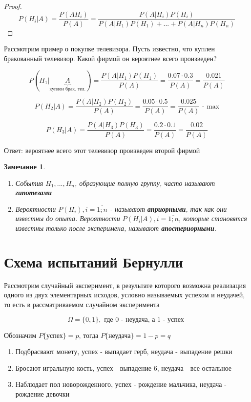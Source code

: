 \documentclass[a4paper, 14pt]{report}
\newtheorem{note}{Замечание}[chapter]
\begin{document}
\begin{proof}
    $$
    P(H_i|A) = \frac{P(A H_i)}{P(A)} = \frac{P(A|H_i) P(H_i)}{P(A|H_1) P(H_1) + ... + P(A|H_n) P(H_n) }
    $$
\end{proof}

Рассмотрим пример о покупке телевизора. Пусть известно, что куплен бракованный телевизор. Какой фирмой он вероятнее всего произведен?

$$
P(H_1| \underbrace{A}_\text{куплен брак. тел.}) = \frac{P(A|H_1)P(H_1)}{P(A)} = \frac{0.07 \cdot 0.3}{P(A)} = \frac{0.021}{P(A)}
$$

$$
P(H_2|A) = \frac{P(A|H_2)P(H_2)}{P(A)} = \frac{0.05 \cdot 0.5}{P(A)} = \frac{0.025}{P(A)} \text{ - max}
$$

$$
P(H_3|A) = \frac{P(A|H_3)P(H_3)}{P(A)} = \frac{0.2 \cdot 0.1}{P(A)} = \frac{0.02}{P(A)}
$$

Ответ: вероятнее всего этот телевизор произведен второй фирмой

\begin{note}
    \begin{enumerate}
        \item События $H_1,...,H_n$, образующие полную группу, часто называют \textbf{гипотезами}
        \item Вероятности $P(H_i), i = \overline{1;n}$ - называют \textbf{априорными}, так как они известны до опыта. Вероятности $P(H_i|A), i = \overline{1;n}$, которые становятся известны только после эксперимена, называют \textbf{апостериорными}.
    \end{enumerate}
\end{note}

\section{Схема испытаний Бернулли}

Рассмотрим случайный эксперимент, в результате которого возможна реализация одного из двух элементарных исходов, условно называемых успехом и неудачей, то есть в рассматриваемом случайном эксперимента

$$
\Omega = \{ 0,1 \}, \text{ где 0 - неудача, а 1 - успех }
$$

Обозначим $P\{\text{успех}\} = p$, тогда $P\{\text{неудача}\} = 1 - p = q$

\begin{enumerate}
    \item Подбрасвают монету, успех - выпадает герб, неудача - выпадение решки
    \item Бросают игральную кость, успех - выпадение 6, неудача - все остальное
    \item Наблюдает пол новорожденного, успех - рождение мальчика, неудача - рождение девочки
\end{enumerate}
\end{document}
